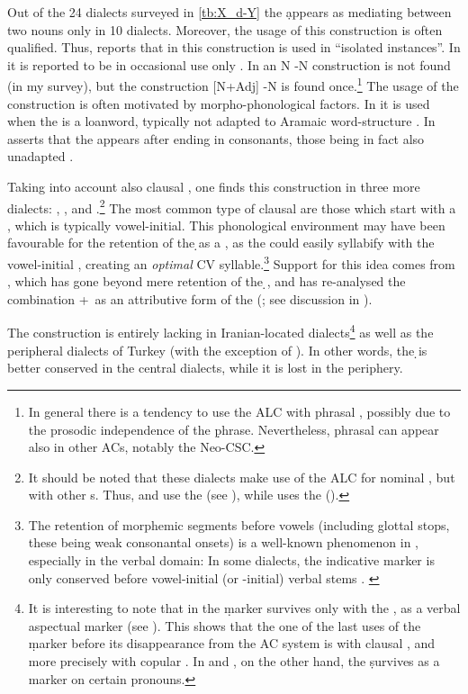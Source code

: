 Out of the 24 dialects surveyed in \vref{tb:X_d-Y} the \d appears as mediating between two nouns only in  10 dialects.  Moreover, the usage of this construction is often qualified. Thus, \citet[192]{KhanSulemaniyya} reports that in \JSul this construction is used in \enquote{isolated instances}. In \Barw  it is reported to be in occasional use only \parencites[398]{KhanBarwar}. In \CArd an N \D-N construction is not found (in my survey), but the construction [N+Adj] \D-N  is found once.\footnote{In general there is a tendency to use the ALC with phrasal \prims, possibly due to the prosodic independence of the \d phrase. Nevertheless, phrasal \prims can appear also in other ACs, notably the Neo-CSC.} The usage of the construction is often motivated by morpho-phonological factors. In \Cal it is used when the \prim is a loanword, typically not adapted to Aramaic word-structure \citep[46]{FassbergChalla}. In \Jil \citet[60]{FoxJilu} asserts that the \lnk* appears after \prims ending in consonants, those being in fact also unadapted . 




Taking into account also clausal \secns, 
one finds this construction in three more  dialects: \JZax, \Betn, and \Arb.\footnote{It should be noted that these dialects make use of the ALC for nominal \secns, but with other \lnk*s. Thus, \JZax and \Betn use the \lnk* {} (see ), while \Arb uses the \lnk* {} ().} 
 The most common type of clausal \secns are those which start with a , which is typically vowel-initial. This phonological environment may have been favourable for the retention of the \d \lnk* as a \rel*, as the \lnk* could easily syllabify with the vowel-initial , creating an \textit{optimal} CV syllable.\footnote{The retention of morphemic segments before vowels (including glottal stops, these being weak consonantal onsets) is a well-known phenomenon in , especially in the verbal domain: In some dialects, the indicative marker  is only conserved before vowel-initial (or -initial) verbal stems \citep[e.g.\ \JArb: ][248]{KhanArbel}. \label{ft:pre_vocalic_retention}} Support for this idea comes from  \JZax, which has gone beyond mere retention of the \d \lnk*, and has re-analysed the combination +\cop\  as an attributive form of the  (\cite{CohenNucleus}; see discussion in ). 


The construction is entirely  lacking in Iranian-located dialects\footnote{It is interesting to note that in \Sar the \d marker survives only with the , as a verbal aspectual marker (see ). This shows that the one of the last uses of the \d marker before its disappearance from the  AC system is with clausal \secns, and more precisely with copular \secns. In \JSan and \JUrm, on the other hand, the \d survives as a \gen* marker on certain pronouns.} as well as the peripheral  dialects of Turkey (with the exception of \Her). In other words, the \d \lnk* is better conserved in the central dialects, while it is  lost in the periphery. 

